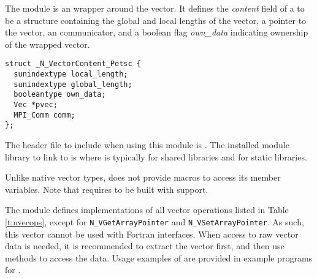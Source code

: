 %
The {\nvecpetsc} module is an {\nvector} wrapper around the {\petsc} vector.
It defines the {\em content} field of a  to be a structure containing
the global and local lengths of the vector, a pointer to the {\petsc} vector,
an {\mpi} communicator, and a boolean flag {\em own\_data} indicating ownership of 
the wrapped {\petsc} vector.
\begin{verbatim} 
struct _N_VectorContent_Petsc {
  sunindextype local_length;
  sunindextype global_length;
  booleantype own_data;
  Vec *pvec;
  MPI_Comm comm;
};
\end{verbatim}

The header file to include when using this module is .
The installed module library to link to is
where  is typically  for shared libraries and 
for static libraries.

Unlike native {\sundials} vector types, {\nvecpetsc} does not provide macros 
to access its member variables.
Note that {\nvecpetsc} requires {\sundials} to be built with {\mpi} support.


The {\nvecpetsc} module defines implementations of all vector operations listed 
in Table \ref{t:nvecops}, except for \verb|N_VGetArrayPointer| and 
\verb|N_VSetArrayPointer|. As such, this vector cannot be used with {\sundials} Fortran interfaces.
When access to raw vector data is needed, it is 
recommended to extract the {\petsc} vector first, and then use {\petsc} 
methods to access the data. Usage examples of {\nvecpetsc} are provided in 
example programs for {\ida} \cite{ida_ex}.

